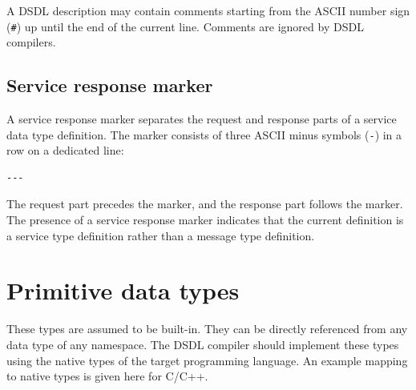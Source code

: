 A DSDL description may contain comments starting from the ASCII number sign (\verb|#|)
up until the end of the current line.
Comments are ignored by DSDL compilers.

\subsection{Service response marker}\label{sec:dsdl_service_response_marker}

A service response marker separates the request and response parts of a service data type definition.
The marker consists of three ASCII minus symbols (\verb|-|) in a row on a dedicated line:

\begin{verbatim}
---
\end{verbatim}

The request part precedes the marker, and the response part follows the marker.
The presence of a service response marker indicates that the current definition is a
service type definition rather than a message type definition.

\section{Primitive data types}\label{sec:dsdl_primitive_data_types}

These types are assumed to be built-in.
They can be directly referenced from any data type of any namespace.
The DSDL compiler should implement these types using the native types of the target programming language.
An example mapping to native types is given here for C/C++.


